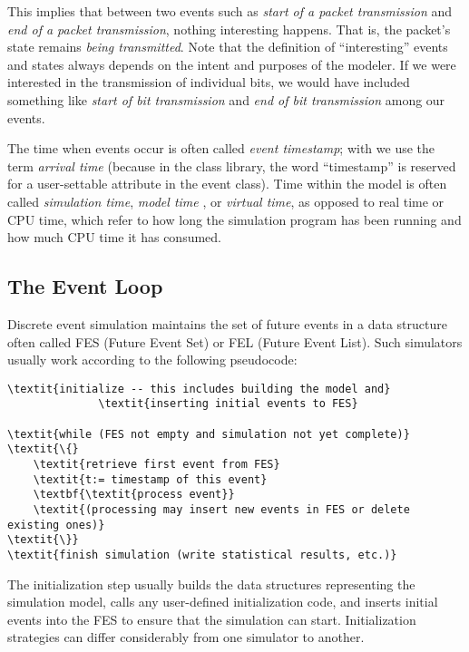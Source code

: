 This implies that between two events such as \textit{start of a packet
transmission} and \textit{end of a packet transmission}, nothing
interesting happens. That is, the packet's state remains \textit{being
transmitted}. Note that the definition of ``interesting'' events and states always
depends on the intent and purposes of the modeler.
If we were interested in the transmission of individual bits, we would
have included something like \textit{start of bit transmission} and
\textit{end of bit transmission} among our events.


The time when events occur is often called \textit{event timestamp};
 with {\opp} we use the term
\textit{arrival time} (because in the class
library, the word ``timestamp'' is reserved for a user-settable
attribute in the event class). Time within the model is often called
\textit{simulation time}, \textit{model time}
, or \textit{virtual time},
as opposed to real time or CPU time,
which refer to how long the simulation program has been running and
how much CPU time it has consumed.



\subsection{The Event Loop}
\label{sec:simple-modules:event-loop}

Discrete event simulation maintains the set of future
events in a data structure often called
FES (Future Event Set) or FEL (Future Event List).
Such simulators usually work according to the following pseudocode:

\begin{Verbatim}[commandchars=\\\{\}]
\textit{initialize -- this includes building the model and}
              \textit{inserting initial events to FES}

\textit{while (FES not empty and simulation not yet complete)}
\textit{\{}
    \textit{retrieve first event from FES}
    \textit{t:= timestamp of this event}
    \textbf{\textit{process event}}
    \textit{(processing may insert new events in FES or delete existing ones)}
\textit{\}}
\textit{finish simulation (write statistical results, etc.)}
\end{Verbatim}


The initialization step usually builds the data structures
representing the simulation model, calls any user-defined
initialization code, and inserts initial events
into the FES to ensure that the simulation can start. Initialization
strategies can differ considerably from one simulator to another.


